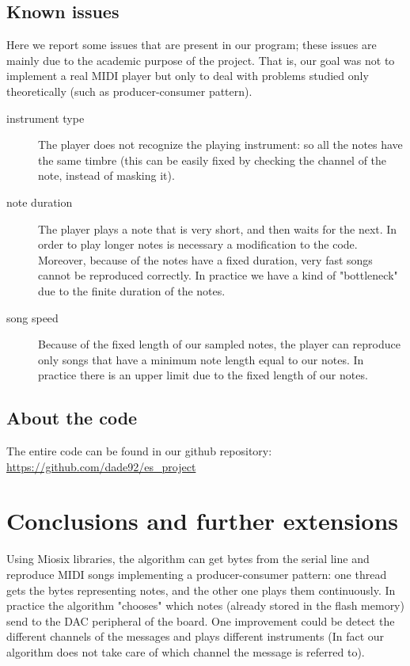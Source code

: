 \documentclass[12pt]{article}
\begin{document}
\subsection{Known issues}
Here we report some issues that are present in our program; these issues are mainly due to the academic purpose of the project. That is, our goal was not to implement a real MIDI player but only to deal with problems studied only theoretically (such as producer-consumer pattern).
\begin{description}
	\item[instrument type] The player does not recognize the playing instrument: so all the notes have the same timbre (this can be easily fixed by checking the channel of the note, instead of masking it).
	\item[note duration] The player plays a note that is very short, and then waits for the next. In order to play longer notes is necessary a modification to the code. Moreover, because of the notes have a fixed duration, very fast songs cannot be reproduced correctly. In practice we have a kind of "bottleneck" due to the finite duration of the notes.
	\item[song speed] Because of the fixed length of our sampled notes, the player can reproduce only songs that have a minimum note length equal to our notes. In practice there is an upper limit due to the fixed length of our notes.
\end{description}

\subsection{About the code}
The entire code can be found in our github repository: \url{https://github.com/dade92/es_project}

\section{Conclusions and further extensions}
Using Miosix libraries, the algorithm can get bytes from the serial line and reproduce MIDI songs implementing a producer-consumer pattern: one thread gets the bytes representing notes, and the other one plays them continuously. In practice the algorithm "chooses" which notes (already stored in the flash memory) send to the DAC peripheral of the board. One improvement could be detect the different channels of the messages and plays different instruments (In fact our algorithm does not take care of which channel the message is referred to). 
\end{document}
